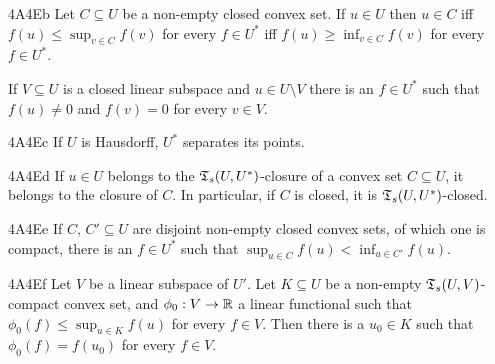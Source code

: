 \spheader 4A4Eb Let $C\subseteq U$ be a non-empty closed convex set.
If $u\in U$ then $u\in C$ iff $f(u)\le\sup_{v\in C}f(v)$ for every
$f\in U^*$ iff $f(u)\ge\inf_{v\in C}f(v)$ for every $f\in U^*$.

If $V\subseteq U$ is a closed linear subspace and $u\in U\setminus V$
there
is an $f\in U^*$ such that $f(u)\ne 0$ and $f(v)=0$ for every $v\in V$.

\spheader 4A4Ec If $U$ is Hausdorff, $U^*$ separates its
points.

\spheader 4A4Ed If $u\in U$ belongs to the $\frak T_s(U,U^*)$-closure of
a convex set $C\subseteq U$, it belongs to the closure of
$C$.
In particular, if $C$ is closed, it is $\frak T_s(U,U^*)$-closed.

\spheader 4A4Ee If $C$, $C'\subseteq U$ are disjoint non-empty closed
convex sets, of
which one is compact, there is an $f\in U^*$ such that
$\sup_{u\in C}f(u)<\inf_{u\in C'}f(u)$.

\spheader 4A4Ef Let $V$ be a linear subspace of
$U'$.   Let $K\subseteq U$ be a non-empty $\frak T_s(U,V)$-compact
convex set, and $\phi_0:V\to\Bbb R$ a linear functional such that
$\phi_0(f)\le\sup_{u\in K}f(u)$ for every $f\in V$.   Then there is a
$u_0\in K$ such that $\phi_0(f)=f(u_0)$ for every $f\in V$.

